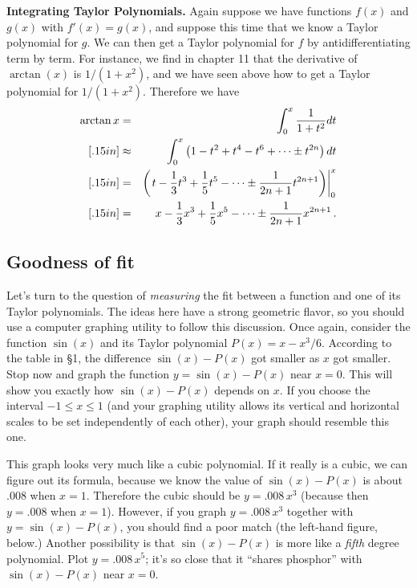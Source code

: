 {{{{\medskip



{\bf Integrating Taylor Polynomials.}  Again suppose we have functions $f(x)$ and $g(x)$ with $f'(x) = g(x)$, and suppose this time that we know a Taylor polynomial for $g$.  We can then get a Taylor polynomial for $f$ by antidifferentiating term by term.  For instance, we find in chapter 11 that the derivative of $\arctan(x)$ is $1/(1+x^2)$, and we have seen above how to get a Taylor polynomial for  $1/(1+x^2)$.  Therefore we have
\begin{eqnarray*}
\arctan{x} &= & \int_0^x \frac{1}{1+t^2} dt \\ [.15in]
        &\approx& \int_0^x \left( 1-t^2+t^4-t^6+ \cdots \pm t^{2n}\right) dt \\ [.15in]
        &=&\left( \left. t-{1 \over 3}t^3 + {1 \over 5} t^5 - \cdots \pm {1 \over {2n+1}}t^{2n+1}\right) \right|_0^x \\ [.15in]
        &=&x-{1 \over 3}x^3 + {1 \over 5} x^5 - \cdots \pm {1 \over {2n+1}}x^{2n+1} \, .
\end{eqnarray*}


\subsection{Goodness of fit}

        Let's turn to the question of {\em measuring\/}
the fit between a function and one of its Taylor polynomials.  The ideas here have a strong geometric flavor, so you should use a computer graphing utility to follow this discussion.  Once again, consider the function $\sin(x)$ and its Taylor polynomial $P(x) = x - x^3/6$.  According to the table in \S 1, the difference $\sin(x) - P(x)$ got smaller as $x$ got smaller.  Stop now and graph the function $y = \sin(x) - P(x)$ near $x = 0$.  This will show you exactly how $\sin(x) - P(x)$ depends on $x$.  If you choose the interval $-1 \leq x \leq 1$ (and your graphing utility allows its vertical and horizontal scales to be set independently of each other), your graph should resemble this one.\label{startsine}


\vspace{122pt}

        This graph looks very much like a cubic polynomial.  
If it really is a cubic, we can figure out its formula, because we know
the value of $\sin(x) - P(x)$ is about .008 when $x = 1$.  Therefore the
cubic should be $y = .008 \, x^3$ (because then $y = .008$ when $x =
1$).  However, if you graph $y = .008 \, x^3$ together with $y = \sin(x)
- P(x)$, you should  find a poor match (the left-hand figure, below.)
Another possibility is that $\sin(x) - P(x)$ is more like a {\em
  fifth\/} degree polynomial.  Plot $y = .008 \, x^5$; it's so close
that it ``shares phosphor'' with $\sin(x) - P(x)$ near $x = 0$.

}}}}
